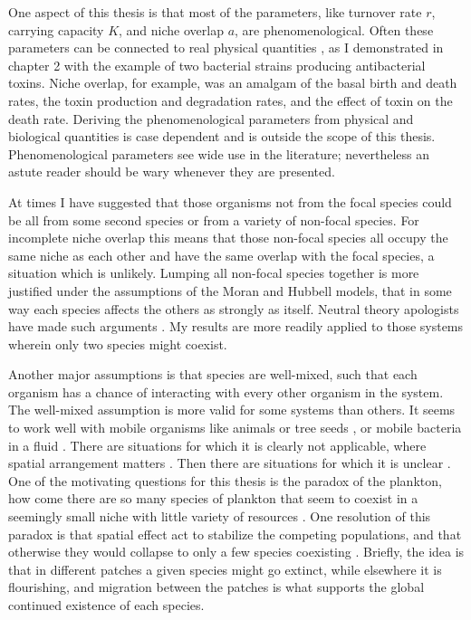 One aspect of this thesis is that most of the parameters, like turnover rate $r$, carrying capacity $K$, and niche overlap $a$, are phenomenological. 
Often these parameters can be connected to real physical quantities \cite{Caperon1967,MacArthur1967}, as I demonstrated in chapter 2 with the example of two bacterial strains producing antibacterial toxins. 
Niche overlap, for example, was an amalgam of the basal birth and death rates, the toxin production and degradation rates, and the effect of toxin on the death rate. 
Deriving the phenomenological parameters from physical and biological quantities is case dependent and is outside the scope of this thesis. 
Phenomenological parameters see wide use in the literature; nevertheless an astute reader should be wary whenever they are presented. 

At times I have suggested that those organisms not from the focal species could be all from some second species or from a variety of non-focal species. 
For incomplete niche overlap this means that those non-focal species all occupy the same niche as each other and have the same overlap with the focal species, a situation which is unlikely. 
Lumping all non-focal species together is more justified under the assumptions of the Moran and Hubbell models, that in some way each species affects the others as strongly as itself. 
Neutral theory apologists have made such arguments \cite{Hubbell2006,Rosindell2011}. %
My results are more readily applied to those systems wherein only two species might coexist. 

Another major assumptions is that species are well-mixed, such that each organism has a chance of interacting with every other organism in the system. 
The well-mixed assumption is more valid for some systems than others. 
It seems to work well with mobile organisms like animals or tree seeds \cite{Hubbell2001}, or mobile bacteria in a fluid \cite{Gore2009,Frey2010,Posfai2017,Abreu2019}. %
There are situations for which it is clearly not applicable, where spatial arrangement matters \cite{Durrett1994,Tilman1997,Haydon2001,Houchmandzadeh2002,Korolev2011}. 
Then there are situations for which it is unclear \cite{MacArthur1970,Peterson1997,Chesson2000,Kessler2015}. 
One of the motivating questions for this thesis is the paradox of the plankton, how come there are so many species of plankton that seem to coexist in a seemingly small niche with little variety of resources \cite{Hutchinson1961}. 
One resolution of this paradox is that spatial effect act to stabilize the competing populations, and that otherwise they would collapse to only a few species coexisting \cite{Roy2007}. 
Briefly, the idea is that in different patches a given species might go extinct, while elsewhere it is flourishing, and migration between the patches is what supports the global continued existence of each species. 

